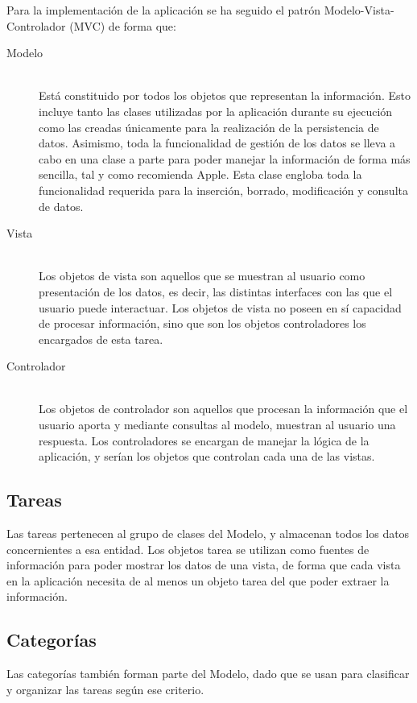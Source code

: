 \documentclass[parskip=half*]{scrartcl}
\begin{document}
Para la implementaci\'on de la aplicaci\'on se ha seguido el patr\'on Modelo-Vista-Controlador (MVC) de forma que:
\begin{description}
	\item[Modelo] \hfill \\ Est\'a constituido por todos los objetos que representan la informaci\'on. Esto incluye tanto las clases utilizadas por la aplicaci\'on durante su ejecuci\'on como las creadas \'unicamente para la realizaci\'on de la persistencia de datos. Asimismo, toda la funcionalidad de gesti\'on de los datos se lleva a cabo en una clase a parte para poder manejar la informaci\'on de forma m\'as sencilla, tal y como recomienda Apple. Esta clase engloba toda la funcionalidad requerida para la inserci\'on, borrado, modificaci\'on y consulta de datos.
	\item[Vista] \hfill \\ Los objetos de vista son aquellos que se muestran al usuario como presentaci\'on de los datos, es decir, las distintas interfaces con las que el usuario puede interactuar. Los objetos de vista no poseen en s\'i capacidad de procesar informaci\'on, sino que son los objetos controladores los encargados de esta tarea.
	\item[Controlador] \hfill \\ Los objetos de controlador son aquellos que procesan la informaci\'on que el usuario aporta y mediante consultas al modelo, muestran al usuario una respuesta. Los controladores se encargan de manejar la l\'ogica de la aplicaci\'on, y ser\'ian los objetos que controlan cada una de las vistas.
\end{description}

\subsection{Tareas}

Las tareas pertenecen al grupo de clases del Modelo, y almacenan todos los datos concernientes a esa entidad. Los objetos tarea se utilizan como fuentes de informaci\'on para poder mostrar los datos de una vista, de forma que cada vista en la aplicaci\'on necesita de al menos un objeto tarea del que poder extraer la informaci\'on.

\subsection{Categor\'ias}

Las categor\'ias tambi\'en forman parte del Modelo, dado que se usan para clasificar y organizar las tareas seg\'un ese criterio.
\end{document}
